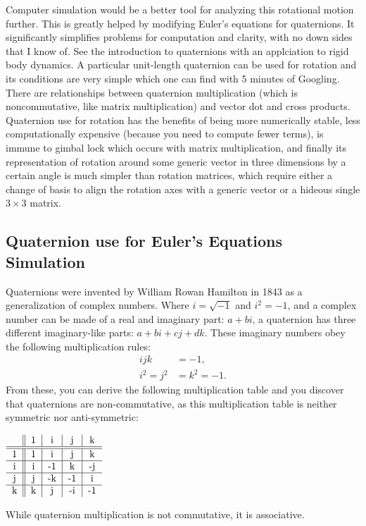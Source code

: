 \documentclass[10pt]{article}
\begin{document}
Computer simulation would be a better tool for analyzing this rotational 
motion further. This is greatly helped by modifying 
Euler's equations for quaternions. It significantly simplifies 
problems for computation and clarity, with no down sides that I know of. See 
the introduction to quaternions with an applciation to rigid body dynamics. 
A particular  unit-length quaternion can be used for rotation and 
its conditions are very simple which one can find with 5 minutes of 
Googling. There are relationships between quaternion 
multiplication (which is noncommutative, like matrix multiplication) and 
vector dot and cross products. Quaternion use for rotation has the 
benefits of being more numerically stable, less computationally 
expensive (because you need to compute fewer terms), is immune to 
gimbal lock which occurs with matrix multiplication, and finally its 
representation of rotation around some generic vector in three dimensions by 
a certain angle is much simpler than rotation matrices, which 
require either a change of basis to align the rotation axes with a generic 
vector or a hideous single $3\times3$ matrix. 

\subsection{Quaternion use for Euler's Equations Simulation}

Quaternions were invented by William Rowan Hamilton in 1843 as a generalization 
of complex numbers. Where $i=\sqrt{-1}$ and $i^2=-1$, and a complex number 
can be made of a real and imaginary part: $a + bi$, a quaternion has 
three different imaginary-like parts: $a+bi+cj+dk$. These imaginary numbers 
obey the following multiplication rules:
\begin{align}
    ijk&=-1, \\
    i^2=j^2&=k^2=-1.
\end{align}
From these, you can derive the following multiplication table and you 
discover that quaternions are non-commutative, as this multiplication 
table is neither symmetric nor anti-symmetric:
\begin{center}
    $
    \begin{tabular}[h!]{c || c | c | c | c}
         & 1 & i & j & k \\
        \hline
        \hline
        1 & 1 & i & j & k \\
        \hline
        i & i & -1 & k & -j \\
        \hline
        j & j & -k & -1 & i \\
        \hline
        k & k & j & -i & -1 
    \end{tabular}
    $
\end{center}
While quaternion multiplication is not commutative, it is associative. 
\end{document}
